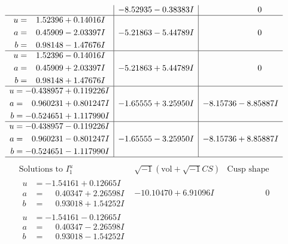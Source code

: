 \documentclass[1p]{elsarticle_modified}
\theoremstyle{definition}
\newcommand{\I}{\sqrt{-1}}
\begin{document}
$$\begin{array}{c|c|c}
 & -8.52935 - 0.38383 I & \phantom{-0.000000 } 0 \\ \hline\begin{aligned}
u &= \phantom{-}1.52396 + 0.14016 I \\
a &= \phantom{-}0.45909 - 2.03397 I \\
b &= \phantom{-}0.98148 - 1.47676 I\end{aligned}
 & -5.21863 - 5.44789 I & \phantom{-0.000000 } 0 \\ \hline\begin{aligned}
u &= \phantom{-}1.52396 - 0.14016 I \\
a &= \phantom{-}0.45909 + 2.03397 I \\
b &= \phantom{-}0.98148 + 1.47676 I\end{aligned}
 & -5.21863 + 5.44789 I & \phantom{-0.000000 } 0 \\ \hline\begin{aligned}
u &= -0.438957 + 0.119226 I \\
a &= \phantom{-}0.960231 + 0.801247 I \\
b &= -0.524651 + 1.117990 I\end{aligned}
 & -1.65555 + 3.25950 I & -8.15736 - 8.85887 I \\ \hline\begin{aligned}
u &= -0.438957 - 0.119226 I \\
a &= \phantom{-}0.960231 - 0.801247 I \\
b &= -0.524651 - 1.117990 I\end{aligned}
 & -1.65555 - 3.25950 I & -8.15736 + 8.85887 I\\
 \hline 
 \end{array}$$\newpage$$\begin{array}{c|c|c}  
\text{Solutions to }I^u_{1}& \I (\text{vol} + \sqrt{-1}CS) & \text{Cusp shape}\\
 \hline 
\begin{aligned}
u &= -1.54161 + 0.12665 I \\
a &= \phantom{-}0.40347 + 2.26598 I \\
b &= \phantom{-}0.93018 + 1.54252 I\end{aligned}
 & -10.10470 + 6.91096 I & \phantom{-0.000000 } 0 \\ \hline\begin{aligned}
u &= -1.54161 - 0.12665 I \\
a &= \phantom{-}0.40347 - 2.26598 I \\
b &= \phantom{-}0.93018 - 1.54252 I\end{aligned}

\end{array}$$
\end{document}
